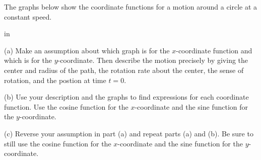 \documentclass{ximera}
\newcommand{\pskip}{\vskip 0.1 in}
\begin{document}
\begin{example} \label{Ex2:Graphs}
The graphs below show the coordinate functions for a motion around a circle at a constant speed. 

\pskip


(a) Make an assumption about which graph is for the $x$-coordinate function and which is for the $y$-coordinate. Then describe the motion precisely by giving the center and radius of the path, the rotation rate about the center, the sense of rotation, and the  postion at time $t=0$.

(b) Use your description and the graphs to find expressions for each coordinate function. Use the cosine function for the $x$-coordinate and the sine function for the $y$-coordinate.

(c) Reverse  your assumption in part (a) and repeat parts (a) and (b). Be sure to still use the cosine function for the $x$-coordinate and the sine function for the $y$-coordinate.


\begin{exploration}
 
\begin{onlineOnly}
    \begin{center}
\end{center}
\end{onlineOnly}
\end{exploration}

\end{example}
\end{document}

